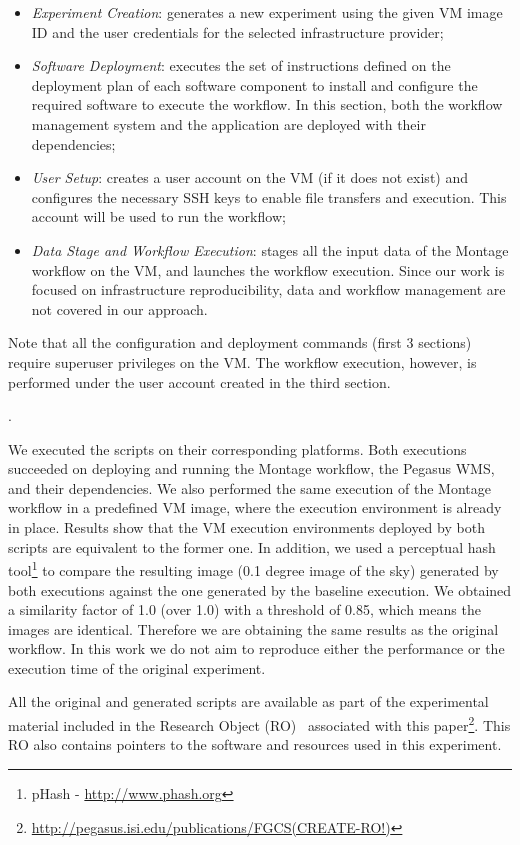 \begin{itemize}

	\item \emph{Experiment Creation}: generates a new experiment using the given VM image ID and the user credentials for the selected infrastructure provider;
    	    
	\item \emph{Software Deployment}: executes the set of instructions defined on the deployment plan of each software component to install and configure the required software to execute the workflow. In this section, both the workflow management system and the application are deployed with their dependencies;

	\item \emph{User Setup}: creates a user account on the VM (if it does not exist) and configures the necessary SSH keys to enable file transfers and execution. This account will be used to run the workflow;
	   
	\item \emph{Data Stage and Workflow Execution}: stages all the input data of the Montage workflow on the VM, and launches the workflow execution. Since our work is focused on infrastructure reproducibility, data and workflow management are not covered in our approach.

\end{itemize}

\noindent Note that all the configuration and deployment commands (first 3 sections) require superuser privileges on the VM. The workflow execution, however, is performed under the user account created in the third section.


.

We executed the scripts on their corresponding platforms. Both executions succeeded on deploying and running the Montage workflow, the Pegasus WMS, and their dependencies. We also performed the same execution of the Montage workflow in a predefined VM image, where the execution environment is already in place. Results show that the VM execution environments deployed by both scripts are equivalent to the former one. In addition, we used a perceptual hash tool\footnote{pHash - \url{http://www.phash.org}} to compare the resulting image (0.1 degree image of the sky) generated by both executions against the one generated by the baseline execution. We obtained a similarity factor of 1.0 (over 1.0) with a threshold of 0.85, which means the images are identical. Therefore we are obtaining the same results as the original workflow. In this work we do not aim to reproduce either the performance or the execution time of the original experiment.



All the original and generated scripts are available as part of the experimental material included in the Research Object (RO)~\cite{researchObjects} associated with this paper\footnote{\url{http://pegasus.isi.edu/publications/FGCS(CREATE-RO!)}}. This RO also contains pointers to the software and resources used in this experiment.